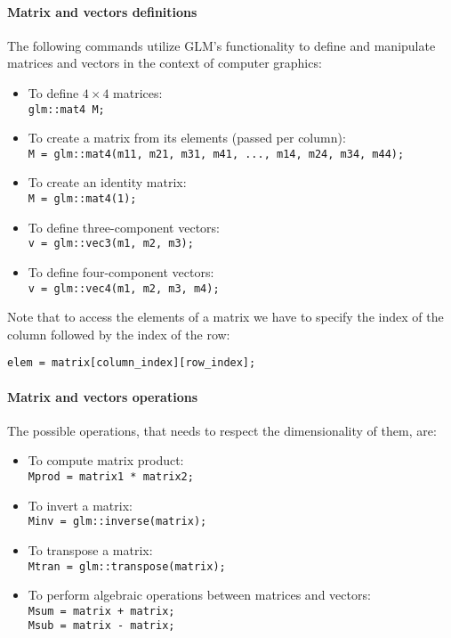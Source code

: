 \paragraph*{Matrix and vectors definitions}
The following commands utilize GLM's functionality to define and manipulate matrices and vectors in the context of computer graphics:
\begin{itemize}
    \item To define $4 \times 4$ matrices: \\
        \texttt{glm::mat4 M;}
    \item To create a matrix from its elements (passed per column): \\
        \texttt{M = glm::mat4(m11, m21, m31, m41, ..., m14, m24, m34, m44);}
    \item To create an identity matrix: \\
        \texttt{M = glm::mat4(1);}
    \item To define three-component vectors: \\
        \texttt{v = glm::vec3(m1, m2, m3);}
    \item To define four-component vectors: \\
        \texttt{v = glm::vec4(m1, m2, m3, m4);} 
\end{itemize}
Note that to access the elements of a matrix we have to specify the index of the column followed by the index of the row: 
\begin{verbatim}
elem = matrix[column_index][row_index];
\end{verbatim}

\paragraph*{Matrix and vectors operations}
The possible operations, that needs to respect the dimensionality of them, are: 
\begin{itemize}
    \item To compute matrix product: \\ 
        \texttt{Mprod = matrix1 * matrix2;}
    \item To invert a matrix: \\ 
        \texttt{Minv = glm::inverse(matrix);}
    \item To transpose a matrix: \\ 
        \texttt{Mtran = glm::transpose(matrix);}
    \item To perform algebraic operations between matrices and vectors: \\ 
        \texttt{Msum = matrix + matrix;} \\
        \texttt{Msub = matrix - matrix;} 
\end{itemize}

